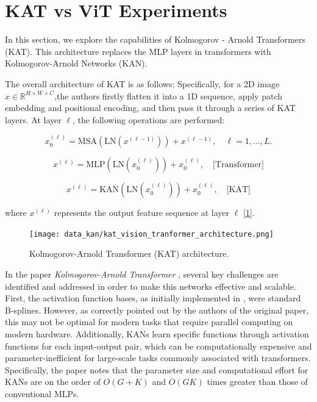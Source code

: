 \documentclass[conference]{IEEEtran}
\begin{document}
\FloatBarrier

\section{KAT vs V{i}T Experiments}

In this section, we explore the capabilities of Kolmogorov - Arnold
Transformers (KAT). This architecture replaces the MLP layers in transformers
with Kolmogorov-Arnold Networks (KAN).

The overall architecture of KAT is as follows: Specifically, for a 2D image \(
x \in \mathbb{R}^{H \times W \times C} \),the authors firstly flatten it into a
1D sequence, apply patch embedding and positional encoding, and then pass it
through a series of KAT layers. At layer \( \ell \), the following operations
are performed:

\begin{equation}
    x_0^{(\ell)} = \text{MSA}(\text{LN}(x^{(\ell-1)})) + x^{(\ell-1)}, \quad \ell = 1, \dots, L.
\end{equation}

\vspace{10pt}

\begin{equation}
    x^{(\ell)} = \text{MLP}(\text{LN}(x_0^{(\ell)})) + x_0^{(\ell)}, \quad \text{[Transformer]}
\end{equation}

\vspace{10pt}

\begin{equation}
    x^{(\ell)} = \text{KAN}(\text{LN}(x_0^{(\ell)})) + x_0^{(\ell)}, \quad \text{[KAT]}
\end{equation}

where \( x^{(\ell)} \) represents the output feature sequence at layer \( \ell
\) [\ref{fig:architecture}].

\begin{figure}[H]
    \centering
    \texttt{[image: data\_kan/kat\_vision\_tranformer\_architecture.png]}
    \caption{Kolmogorov-Arnold Transformer (KAT) architecture.}
    \label{fig:architecture}
\end{figure}

In the paper \textit{Kolmogorov-Arnold Transformer} \cite{kat}, several key
challenges are identified and addressed in order to make this networks
effective and scalable. First, the activation function bases, as initially
implemented in \cite{kans}, were standard B-splines. However, as correctly
pointed out by the authors of the original paper, this may not be optimal for
modern tasks that require parallel computing on modern hardware. Additionally,
KANs learn specific functions through activation functions for each
input-output pair, which can be computationally expensive and
parameter-inefficient for large-scale tasks commonly associated with
transformers. Specifically, the paper notes that the parameter size and
computational effort for KANs are on the order of \( O(G+K) \) and \( O(GK) \)
times greater than those of conventional MLPs.
\end{document}
